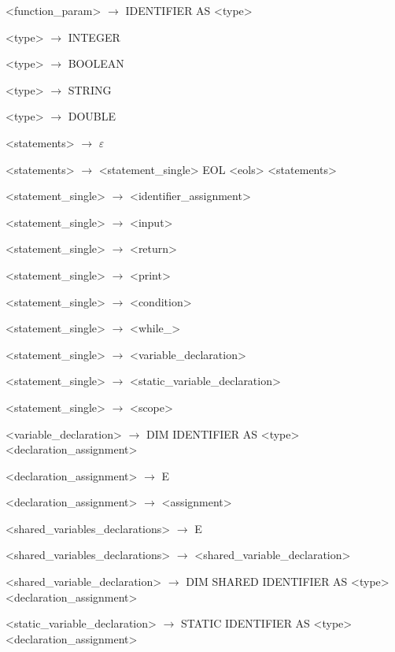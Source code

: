 \begin{normalsize}
\begin{enumerate}
{        \item <function\_param> $\rightarrow$ IDENTIFIER AS <type>


        \item <type> $\rightarrow$ INTEGER
        \item <type> $\rightarrow$ BOOLEAN
        \item <type> $\rightarrow$ STRING
        \item <type> $\rightarrow$ DOUBLE

        \item <statements> $\rightarrow$ $\varepsilon$
        \item <statements> $\rightarrow$ <statement\_single> EOL <eols> <statements>


        \item <statement\_single> $\rightarrow$ <identifier\_assignment>
        \item <statement\_single> $\rightarrow$ <input>
        \item <statement\_single> $\rightarrow$ <return>
        \item <statement\_single> $\rightarrow$ <print>
        \item <statement\_single> $\rightarrow$ <condition>
        \item <statement\_single> $\rightarrow$ <while\_>
        \item <statement\_single> $\rightarrow$ <variable\_declaration>
        \item <statement\_single> $\rightarrow$ <static\_variable\_declaration>
        \item <statement\_single> $\rightarrow$ <scope>

        \item <variable\_declaration> $\rightarrow$ DIM IDENTIFIER AS <type> <declaration\_assignment>
        \item <declaration\_assignment> $\rightarrow$ E
        \item <declaration\_assignment> $\rightarrow$ <assignment>

        \item <shared\_variables\_declarations> $\rightarrow$ E
        \item <shared\_variables\_declarations> $\rightarrow$ <shared\_variable\_declaration>
        \item <shared\_variable\_declaration> $\rightarrow$ DIM SHARED IDENTIFIER AS <type> <declaration\_assignment>

        \item <static\_variable\_declaration> $\rightarrow$ STATIC IDENTIFIER AS <type> <declaration\_assignment>

}
\end{enumerate}
\end{normalsize}
